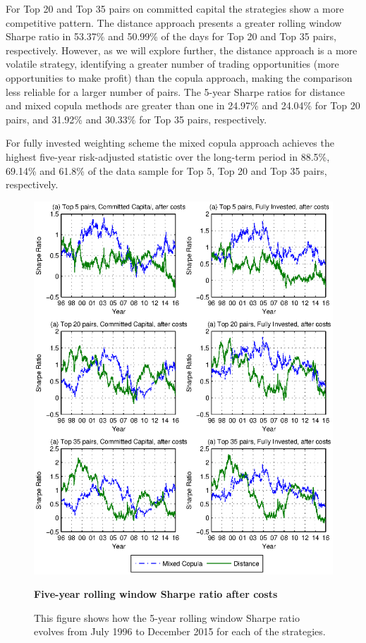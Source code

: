 For Top 20 and Top 35 pairs on committed capital the strategies show a more competitive pattern. The distance approach presents a greater rolling window Sharpe ratio in 53.37\% and 50.99\% of the days for Top 20 and Top 35 pairs, respectively. However, as we will explore further, the distance approach is a more volatile strategy, identifying a greater number of trading opportunities (more opportunities to make profit) than the copula approach, making the comparison less reliable for a larger number of pairs. The 5-year Sharpe ratios for distance and mixed copula methods are greater than one in 24.97\% and 24.04\% for Top 20 pairs, and 31.92\% and 30.33\% for Top 35 pairs, respectively.

For fully invested weighting scheme the mixed copula approach achieves the highest five-year risk-adjusted statistic over the long-term period in 88.5\%, 69.14\% and 61.8\% of the data sample for Top 5, Top 20 and Top 35 pairs, respectively.


\begin{figure}[!ht]
\centering
\includegraphics[width=\linewidth]{Figure4.eps}
\captionsetup{justification=raggedright,
	singlelinecheck=false
}
\caption{\textbf{Five-year rolling window Sharpe ratio after costs}}
\caption*{\scriptsize This figure shows how the 5-year rolling window Sharpe ratio evolves from July 1996 to December 2015 for each of the strategies.}
\label{fig:Figure4}
\end{figure}

